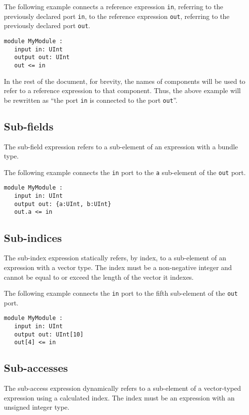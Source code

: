 \documentclass[12pt]{article}
\begin{document}
The following example connects a reference expression \verb|in|, referring to the previously declared port \verb|in|, to the reference expression \verb|out|, referring to the previously declared port \verb|out|.

\begin{lstlisting}
module MyModule :
   input in: UInt
   output out: UInt
   out <= in
\end{lstlisting}

In the rest of the document, for brevity, the names of components will be used to refer to a reference expression to that component. Thus, the above example will be rewritten as ``the port \verb|in| is connected to the port \verb|out|''.

\subsection{Sub-fields}\label{subfields}
The sub-field expression refers to a sub-element of an expression with a bundle type.

The following example connects the \verb|in| port to the \verb|a| sub-element of the \verb|out| port.
\begin{lstlisting}
module MyModule :
   input in: UInt
   output out: {a:UInt, b:UInt}
   out.a <= in
\end{lstlisting}

\subsection{Sub-indices}\label{subindices}
The sub-index expression statically refers, by index, to a sub-element of an expression with a vector type. The index must be a non-negative integer and cannot be equal to or exceed the length of the vector it indexes.

The following example connects the \verb|in| port to the fifth sub-element of the \verb|out| port.
\begin{lstlisting}
module MyModule :
   input in: UInt
   output out: UInt[10]
   out[4] <= in
\end{lstlisting}

\subsection{Sub-accesses}
The sub-access expression dynamically refers to a sub-element of a vector-typed expression using a calculated index. The index must be an expression with an unsigned integer type.
\end{document}
